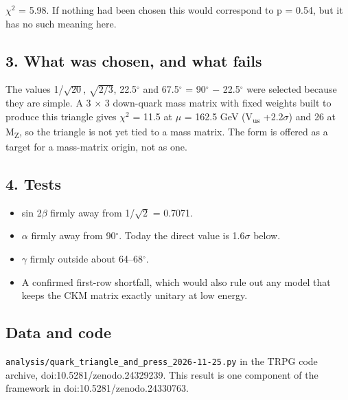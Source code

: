 \documentclass[
  11pt,
]{article}
\providecommand{\tightlist}{%
  \setlength{\itemsep}{0pt}\setlength{\parskip}{0pt}}
\begin{document}
\ensuremath{\chi}\ensuremath{^{2}} = 5.98. If nothing had been chosen this would correspond to p = 0.54, but it has no such meaning here.

\hypertarget{what-was-chosen-and-what-fails}{%
\subsection{3. What was chosen, and what fails}\label{what-was-chosen-and-what-fails}}

The values 1/\ensuremath{\sqrt{20}}, \ensuremath{\sqrt{2/3}}, 22.5\ensuremath{^\circ} and 67.5\ensuremath{^\circ} = 90\ensuremath{^\circ} \ensuremath{-} 22.5\ensuremath{^\circ} were selected because they are simple. A 3 \ensuremath{\times} 3 down-quark mass matrix with fixed weights built to produce this triangle gives \ensuremath{\chi}\ensuremath{^{2}} = 11.5 at \ensuremath{\mu} = 162.5 GeV (\textbar V\textsubscript{us}\textbar{} +2.2\ensuremath{\sigma}) and 26 at M\textsubscript{Z}, so the triangle is not yet tied to a mass matrix. The form is offered as a target for a mass-matrix origin, not as one.

\hypertarget{tests}{%
\subsection{4. Tests}\label{tests}}

\begin{itemize}
\tightlist
\item
  sin 2\ensuremath{\beta} firmly away from 1/\ensuremath{\sqrt{2}} = 0.7071.
\item
  \ensuremath{\alpha} firmly away from 90\ensuremath{^\circ}. Today the direct value is 1.6\ensuremath{\sigma} below.
\item
  \ensuremath{\gamma} firmly outside about 64--68\ensuremath{^\circ}.
\item
  A confirmed first-row shortfall, which would also rule out any model that keeps the CKM matrix exactly unitary at low energy.
\end{itemize}

\hypertarget{data-and-code}{%
\subsection{Data and code}\label{data-and-code}}

\texttt{analysis/quark\_triangle\_and\_press\_2026-11-25.py} in the TRPG code archive, doi:10.5281/zenodo.24329239. This result is one component of the framework in doi:10.5281/zenodo.24330763.
\end{document}
